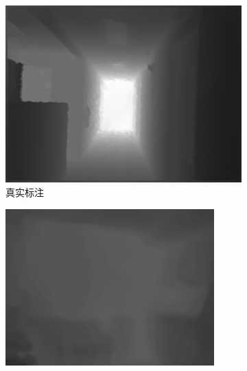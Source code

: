 \begin{figure}[htb]
\begin{subfigure}{0.24\linewidth}
\begin{minipage}[b]{1\linewidth}
    \includegraphics[width=1\linewidth]{figure/FAM/14.png}
    \end{minipage}
    \caption{真实标注}
  \end{subfigure}  
  \begin{subfigure}{0.24\linewidth}
  \begin{minipage}[b]{1\linewidth}
  \includegraphics[width=1\linewidth]{figure/Without_FAM/00000_colors.png}\vspace{4pt}

\end{minipage}
\end{subfigure}
\end{figure}

